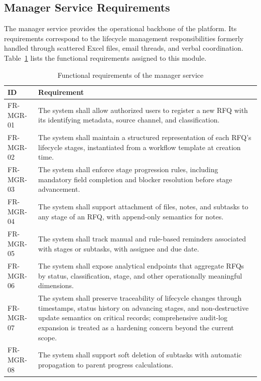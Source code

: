 \subsection*{Manager Service Requirements}
The manager service provides the operational backbone of the platform. Its requirements correspond to the lifecycle management responsibilities formerly handled through scattered Excel files, email threads, and verbal coordination. Table~\ref{tab:fr_manager} lists the functional requirements assigned to this module.

\begin{table}[H]
\centering
\renewcommand{\arraystretch}{1.3}
\begin{tabular}{|p{1.8cm}|p{12cm}|}
\hline
\rowcolor{lightgray}
\textbf{ID} & \textbf{Requirement} \\ \hline
FR-MGR-01 & The system shall allow authorized users to register a new RFQ with its identifying metadata, source channel, and classification. \\ \hline
FR-MGR-02 & The system shall maintain a structured representation of each RFQ's lifecycle stages, instantiated from a workflow template at creation time. \\ \hline
FR-MGR-03 & The system shall enforce stage progression rules, including mandatory field completion and blocker resolution before stage advancement. \\ \hline
FR-MGR-04 & The system shall support attachment of files, notes, and subtasks to any stage of an RFQ, with append-only semantics for notes. \\ \hline
FR-MGR-05 & The system shall track manual and rule-based reminders associated with stages or subtasks, with assignee and due date. \\ \hline
FR-MGR-06 & The system shall expose analytical endpoints that aggregate RFQs by status, classification, stage, and other operationally meaningful dimensions. \\ \hline
FR-MGR-07 & The system shall preserve traceability of lifecycle changes through timestamps, status history on advancing stages, and non-destructive update semantics on critical records; comprehensive audit-log expansion is treated as a hardening concern beyond the current scope. \\ \hline
FR-MGR-08 & The system shall support soft deletion of subtasks with automatic propagation to parent progress calculations. \\ \hline
\end{tabular}
\caption{Functional requirements of the manager service}
\label{tab:fr_manager}
\end{table}


